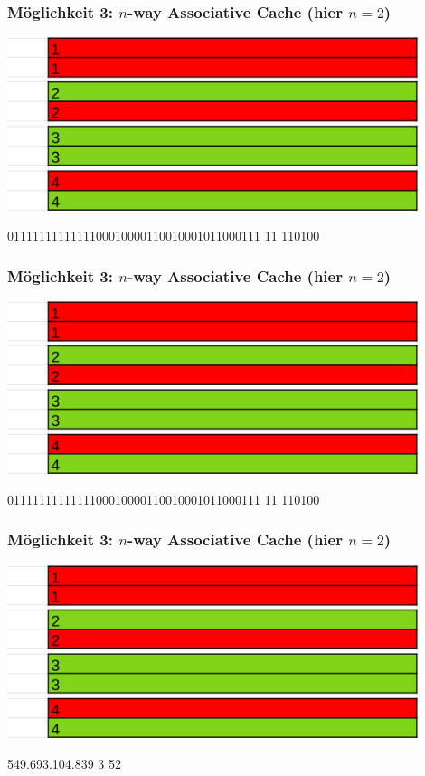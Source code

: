 \documentclass{beamer}
\begin{document}
\begin{frame}
\frametitle{M\"oglichkeit 3: $n$-way Associative Cache (hier $n=2$)}
\centerline{\includegraphics[width=12cm]{nac1.png}}
0111111111111100010000110010001011000111 {\color{blue}11} {\color{orange}110100}
\end{frame}

\begin{frame}
\frametitle{M\"oglichkeit 3: $n$-way Associative Cache (hier $n=2$)}
\centerline{\includegraphics[width=12cm]{nac1.png}}
{\color{brown}0111111111111100010000110010001011000111} {\color{blue}11} {\color{orange}110100}
\end{frame}

\begin{frame}
\frametitle{M\"oglichkeit 3: $n$-way Associative Cache (hier $n=2$)}
\centerline{\includegraphics[width=12cm]{nac1.png}}
{\color{brown}549.693.104.839} {\color{blue}3} {\color{orange}52}
\end{frame}
\end{document}
